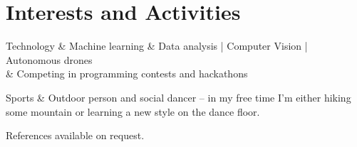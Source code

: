 \documentclass[11pt,a4paper]{article}
\begin{document}
\section*{Interests and Activities}
  \begin {tabu} {} %
    Technology
      & Machine learning \& Data analysis | Computer Vision | Autonomous drones \\
      & Competing in programming contests and hackathons
  \end{tabu}

  \begin{tabu}{}
    Sports
      & Outdoor person and social dancer -- in my free time I'm either hiking some mountain or learning a new style on the dance floor.\\
  \end{tabu}

\vspace{1em}
References available on request.
\end{document}
